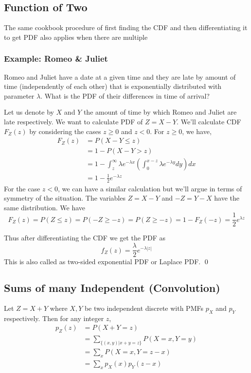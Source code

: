  \subsection{Function of Two \RV}
 The same cookbook procedure of first finding the CDF and then differentiating it to get PDF also applies when there are multiple \rv

\subsubsection{Example: Romeo \& Juliet}
Romeo and Juliet have a date at a given time and they are late by amount of time (independently of each other) that is exponentially distributed with parameter $\lambda$. What is the PDF of their differences in time of arrival?


Let us denote by $X$ and $Y$ the amount of time by which Romeo and Juliet are late respectively. We want to calculate PDF of $Z=X-Y$. We'll calculate CDF $F_Z(z)$ by considering the cases $z\ge 0$ and $z<0$.
For $z\ge 0$, we have,
\begin{align*}
    F_Z(z) &= P(X-Y \le z) \\
           &= 1 - P(X-Y>z) \\
           &= 1 - \int_{z}^{\infty} \lambda e^{-\lambda x} \left(\int_{0}^{x-z} \lambda e^{-\lambda y} dy \right) dx \\
           &= 1 - \frac{1}{2} e^{-\lambda z}
\end{align*}
For the case $z<0$, we can have a similar calculation but we'll argue in terms of symmetry of the situation. The variables $Z=X-Y$ and $-Z=Y-X$ have the same distribution. We have
\[F_Z(z) = P(Z \le z) = P(-Z\ge -z) = P(Z\ge -z)= 1 - F_Z(-z)=\frac{1}{2} e^{\lambda z}\]

Thus after differentiating the CDF we get the PDF as 
\[f_Z(z) = \frac{\lambda}{2}e^{-\lambda |z|}\]
This is also called as two-sided exponential PDF or Laplace PDF.
\qed

\subsection{Sums of many Independent \RV (Convolution)}
Let $Z=X+Y$ where $X,Y$ be two independent discrete \rv with PMFs $p_X$ and $p_Y$ respectively. Then for any integer $z$,
\begin{align*}
    p_Z(z) &= P(X+Y=z) \\
           &= \sum_{\{(x,y)|x+y=z \}} P(X=x, Y=y) \\
           &= \sum_xP(X=x, Y=z-x) \\
           &= \sum_x p_X(x)p_Y(z-x)
\end{align*}

